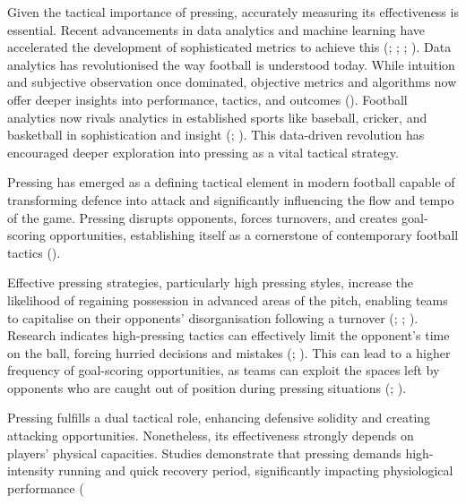 \documentclass[12pt]{article}
\begin{document}
Given the tactical importance of pressing, accurately measuring its effectiveness is essential. Recent advancements in data analytics and machine learning have accelerated the development of sophisticated metrics to achieve this (\cite{link_data_2018}; \cite{memmert_data_2018}; \cite{rein_big_2016}; \cite{rico-gonzalez_markel_machine_2023}). Data analytics has revolutionised the way football is understood today. While intuition and subjective observation once dominated, objective metrics and algorithms now offer deeper insights into performance, tactics, and outcomes (\cite{memmert_data_2018}). Football analytics now rivals analytics in established sports like baseball, cricker, and basketball in sophistication and insight (\cite{herold_machine_2019}; \cite{rico-gonzalez_markel_machine_2023}). This data-driven revolution has encouraged deeper exploration into pressing as a vital tactical strategy.

Pressing has emerged as a defining tactical element in modern football capable of transforming defence into attack and significantly influencing the flow and tempo of the game. Pressing disrupts opponents, forces turnovers, and creates goal-scoring opportunities, establishing itself as a cornerstone of contemporary football tactics (\cite{robberechts_valuing_2019}).

Effective pressing strategies, particularly high pressing styles, increase the likelihood of regaining possession in advanced areas of the pitch, enabling teams to capitalise on their opponents' disorganisation following a turnover (\cite{brindescu_study_2021}; \cite{fernandez-navarro_evaluating_2019}; \cite{modric_influence_2023}). Research indicates high-pressing tactics can effectively limit the opponent's time on the ball, forcing hurried decisions and mistakes (\cite{forcher_is_2023}; \cite{low_porous_2021}). This can lead to a higher frequency of goal-scoring opportunities, as teams can exploit the spaces left by opponents who are caught out of position during pressing situations (\cite{cooper_impact_2020}; \cite{fernandes_how_2020}).

Pressing fulfills a dual tactical role, enhancing defensive solidity and creating attacking opportunities. Nonetheless, its effectiveness strongly depends on players' physical capacities. Studies demonstrate that pressing demands high-intensity running and quick recovery period, significantly impacting physiological performance (\cite{bort}

\printbibliography
\end{document}
